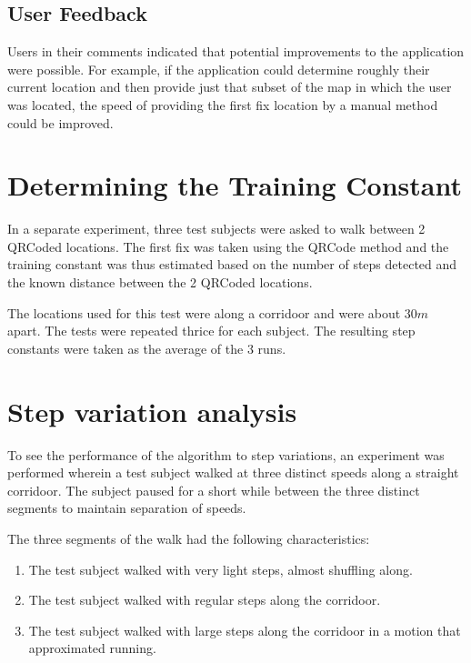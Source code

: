\subsection{User Feedback}

Users in their comments indicated that potential improvements to the 
application were possible. For example, if the application could determine 
roughly their current location and then provide just that subset of the map
in which the user was located, the speed of providing the first fix location 
by a manual method could be improved.

\section{Determining the Training Constant}

In a separate experiment, three test subjects were asked to walk between 
2 QRCoded locations. The first fix was taken using the QRCode method and 
the training constant was thus estimated based on the number of steps 
detected and the known distance between the 2 QRCoded locations.

The locations used for this test were along a corridoor and were about $30 m$
apart. The tests were repeated thrice for each subject. The resulting 
step constants were taken as the average of the 3 runs.


\section{Step variation analysis}

To see the performance of the algorithm to step variations, an experiment 
was performed wherein a test subject walked at three distinct speeds
along a straight corridoor. The subject paused for a short while between 
the three distinct segments to maintain separation of speeds.

The three segments of the walk had the following
characteristics:

\begin{enumerate}
\item The test subject walked with very light steps, almost shuffling along. 
\item The test subject walked with regular steps along the corridoor.
\item The test subject walked with large steps along the corridoor in a motion
    that approximated running.
\end{enumerate}

